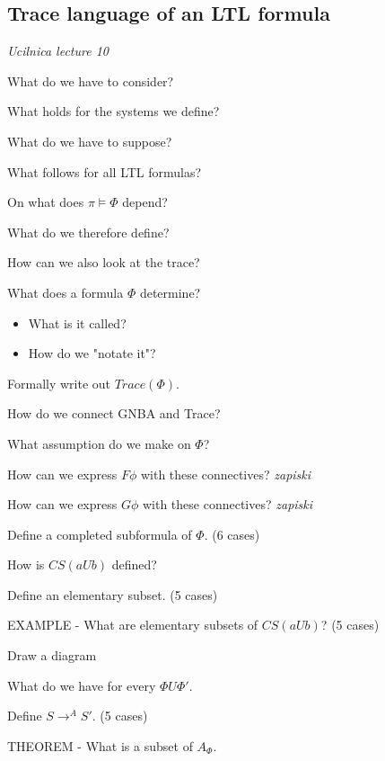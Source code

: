 \documentclass[fleqn]{article}
\begin{document}
\subsection{Trace language of an LTL formula}
\textit{Ucilnica lecture 10}
\begin{enumerate}
    {\color{red}\item What do we have to consider?}
    {\color{red}\item What holds for the systems we define?}
    {\color{red}\item What do we have to suppose?}
    \item What follows for all LTL formulas?
    \item On what does $\pi \models \Phi$ depend?
    \item What do we therefore define?
    \item How can we also look at the trace?
    \item What does a formula $\Phi$ determine?
    \begin{itemize}
        \item What is it called?
        \item How do we "notate it"?
    \end{itemize}
    \item Formally write out $Trace(\Phi)$.
    \item How do we connect GNBA and Trace?
    \item What assumption do we make on $\Phi$?
    \item How can we express $F \phi$ with these connectives? \textit{zapiski}
    \item How can we express $G \phi$ with these connectives? \textit{zapiski}
    \item Define a completed subformula of $\Phi$. (6 cases)
    \item How is $CS(a U b) $ defined?
    \item Define an elementary subset. (5 cases)
    \item EXAMPLE - What are elementary subsets of $CS(a U b)$? (5 cases)
    \item Draw a diagram
    \item What do we have for every $\Phi U \Phi'$.
    \item Define $S \rightarrow^{A} S'$. (5 cases)
    \item THEOREM - What is a subset of $A_{\Phi}$.
\end{enumerate}
\end{document}
